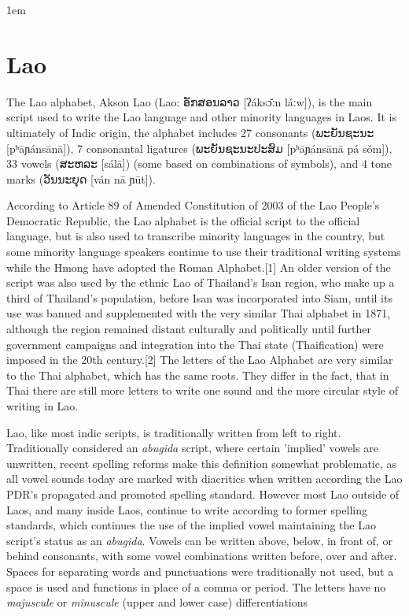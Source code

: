 \parindent1em
\section{Lao}
\label{s:lao}
\def\laotext#1{{\lao#1}}

The Lao alphabet, Akson Lao (Lao: \laotext{ອັກສອນລາວ} [ʔáksɔ̌ːn láːw]), is the main script used to write the Lao language and other minority languages in Laos. It is ultimately of Indic origin, the alphabet includes 27 consonants (\laotext{ພະຍັນຊະນະ} [pʰāɲánsānā]), 7 consonantal ligatures (\laotext{ພະຍັນຊະນະປະສົມ} [pʰāɲánsānā pá sǒm]), 33 vowels (\laotext{ສະຫລະ} [sálā]) (some based on combinations of symbols), and 4 tone marks (\laotext{ວັນນະຍຸດ} [ván nā ɲūt]). 



According to Article 89 of Amended Constitution of 2003 of the Lao People's Democratic Republic, the Lao alphabet is the official script to the official language, but is also used to transcribe minority languages in the country, but some minority language speakers continue to use their traditional writing systems while the Hmong have adopted the Roman Alphabet.[1] An older version of the script was also used by the ethnic Lao of Thailand's Isan region, who make up a third of Thailand's population, before Isan was incorporated into Siam, until its use was banned and supplemented with the very similar Thai alphabet in 1871, although the region remained distant culturally and politically until further government campaigns and integration into the Thai state (Thaification) were imposed in the 20th century.[2] The letters of the Lao Alphabet are very similar to the Thai alphabet, which has the same roots. They differ in the fact, that in Thai there are still more letters to write one sound and the more circular style of writing in Lao.

Lao, like most indic scripts, is traditionally written from left to right. Traditionally considered an \emph{abugida} script, where certain 'implied' vowels are unwritten, recent spelling reforms make this definition somewhat problematic, as all vowel sounds today are marked with diacritics when written according the Lao PDR's propagated and promoted spelling standard. However most Lao outside of Laos, and many inside Laos, continue to write according to former spelling standards, which continues the use of the implied vowel maintaining the Lao script's status as an \emph{abugida}. Vowels can be written above, below, in front of, or behind consonants, with some vowel combinations written before, over and after. Spaces for separating words and punctuations were traditionally not used, but a space is used and functions in place of a comma or period. The letters have no \emph{majuscule} or \emph{minuscule} (upper and lower case) differentiations

